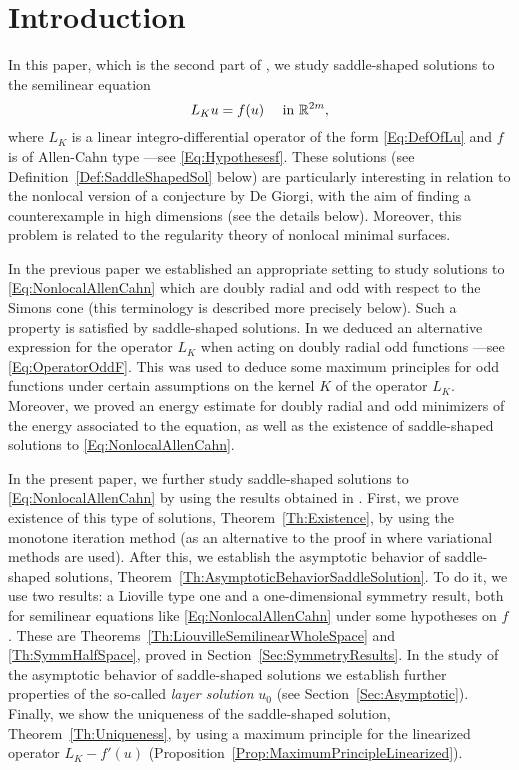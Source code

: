 \section{Introduction}
\label{Sec:Introduction}
 
In this paper, which is the second part of \cite{FelipeSanz-Perela:IntegroDifferentialI}, we study saddle-shaped solutions to the semilinear equation
\begin{equation}
\label{Eq:NonlocalAllenCahn}
L_K u = f(u) \quad \textrm{ in } \mathbb{R}^{2m},
\end{equation}
where $L_K$ is a linear integro-differential operator of the form \eqref{Eq:DefOfLu} and $f$ is of Allen-Cahn type ---see \eqref{Eq:Hypothesesf}. These  solutions (see Definition~\ref{Def:SaddleShapedSol} below) are particularly interesting in relation to the nonlocal version of a conjecture by De Giorgi, with the aim of finding a counterexample in high dimensions (see the details below). Moreover, this problem is related to the regularity theory of nonlocal minimal surfaces.

In the previous paper \cite{FelipeSanz-Perela:IntegroDifferentialI} we established an appropriate setting to study solutions to \eqref{Eq:NonlocalAllenCahn} which are doubly radial and odd with respect to the Simons cone (this terminology is described more precisely below). Such a property is satisfied by saddle-shaped solutions. In \cite{FelipeSanz-Perela:IntegroDifferentialI} we deduced an alternative expression for the operator $L_K$ when acting on doubly radial odd functions ---see \eqref{Eq:OperatorOddF}. This was used to deduce some maximum principles for odd functions under certain assumptions on the kernel $K$ of the operator $L_K$. Moreover, we proved an energy estimate for doubly radial and odd minimizers of the energy associated to the equation, as well as the existence of saddle-shaped solutions to \eqref{Eq:NonlocalAllenCahn}.

In the present paper, we further study saddle-shaped solutions to \eqref{Eq:NonlocalAllenCahn} by using the results obtained in \cite{FelipeSanz-Perela:IntegroDifferentialI}. First, we prove existence of this type of solutions, Theorem~\ref{Th:Existence}, by using the monotone iteration method (as an alternative to the proof in \cite{FelipeSanz-Perela:IntegroDifferentialI} where variational methods are used). After this, we establish the asymptotic behavior of saddle-shaped solutions,  Theorem~\ref{Th:AsymptoticBehaviorSaddleSolution}. To do it, we use two results: a Lioville type one and a one-dimensional symmetry result, both for semilinear equations like \eqref{Eq:NonlocalAllenCahn} under some hypotheses on $f$. These are Theorems~\ref{Th:LiouvilleSemilinearWholeSpace} and \ref{Th:SymmHalfSpace}, proved in Section~\ref{Sec:SymmetryResults}. In the study of the asymptotic behavior of saddle-shaped solutions we establish further properties of the so-called \emph{layer solution} $u_0$ (see Section~\ref{Sec:Asymptotic}). Finally, we show the uniqueness of the saddle-shaped solution, Theorem~\ref{Th:Uniqueness}, by using a maximum principle for the linearized operator $L_K - f'(u)$ (Proposition~\ref{Prop:MaximumPrincipleLinearized}).

